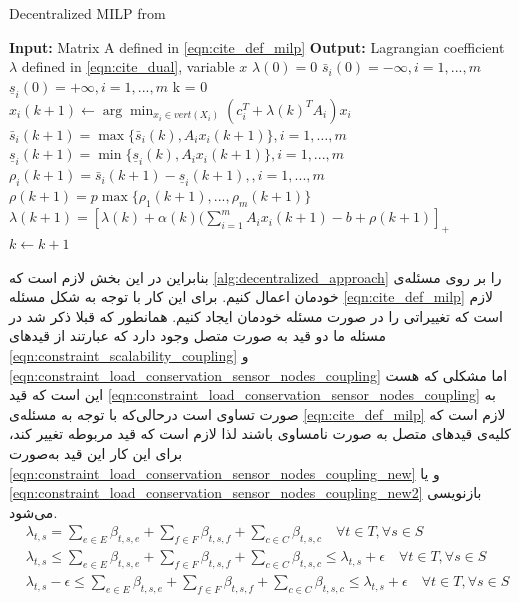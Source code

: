 \begin{latin}
	\begin{algorithm}
		\caption{Decentralized MILP from \cite{decentralized_approach}} \label{alg:decentralized_approach}
		\begin{algorithmic}[1]
			\State \textbf{Input:}  Matrix A defined in \cref{eqn:cite_def_milp}
			\State \textbf{Output:}  Lagrangian coefficient $\lambda$ defined in \cref{eqn:cite_dual}, variable $x$  
			\Procedure{}{}       %
				\State $\lambda(0) = 0$
				\State $\bar{s}_i(0) = -\infty , i = 1,...,m$ 
				\State $\underline{s}_i(0) = +\infty , i = 1,...,m$ 
				\State k = 0
				\Repeat
						\State $x_i(k+1) \gets \arg \displaystyle \min_{x_i \in vert(X_i)} (c_i^T + \lambda(k)^TA_i)x_i$
					\EndFor
					\State $\bar{s}_i(k+1) = \max\{\bar{s}_i(k), A_ix_i(k+1) \} , i = 1, \dots, m$
					\State $\underline{s}_i(k+1) = \min\{\underline{s}_i(k), A_ix_i(k+1) \} , i = 1,...,m$
					\State $\rho_i(k+1) = \bar{s}_i(k+1) - \underline{s}_i(k+1),  , i = 1,...,m$
					\State $\rho(k+1) = p \max \{ \rho_1(k+1), ..., \rho_m(k+1) \}$
					\State $\lambda(k+1) = [\lambda(k) + \alpha(k)(\sum_{i=1}^{m}A_ix_i(k+1)-b+\rho(k+1)]_+$
					\State $k \gets k+1$ 
			\EndProcedure
		\end{algorithmic}
	\end{algorithm}
\end{latin}
	بنابراین در این بخش لازم است که \cref{alg:decentralized_approach} را بر روی مسئله‌ی خودمان اعمال کنیم. برای این کار با توجه به شکل مسئله \cref{eqn:cite_def_milp} لازم است که تغییراتی را در صورت مسئله خودمان ایجاد کنیم. همانطور که قبلا ذکر شد در مسئله ما دو قید به صورت متصل وجود دارد که عبارتند از قیدهای \cref{eqn:constraint_scalability_coupling} و \cref{eqn:constraint_load_conservation_sensor_nodes_coupling} اما مشکلی که هست این است که قید \cref{eqn:constraint_load_conservation_sensor_nodes_coupling} به صورت تساوی است درحالی‌که با توجه به مسئله‌ی \cref{eqn:cite_def_milp} لازم است که کلیه‌ی قیدهای متصل به صورت نامساوی باشند لذا لازم است که قید مربوطه تغییر کند، برای این کار این قید به‌صورت \cref{eqn:constraint_load_conservation_sensor_nodes_coupling_new} و یا \cref{eqn:constraint_load_conservation_sensor_nodes_coupling_new2} بازنویسی می‌شود. 
	\begin{subequations}
		\begin{align}
			&\lambda_{t,s} = \sum_{e \in E} \beta_{t,s,e} + \sum_{f \in F} \beta_{t,s,f}
			+\sum_{c \in C}\beta_{t,s,c} \quad \forall{t \in T}, \forall{s \in S} \\
			&\lambda_{t,s} \le \sum_{e \in E} \beta_{t,s,e} + \sum_{f \in F} \beta_{t,s,f}
			+\sum_{c \in C}\beta_{t,s,c} \le \lambda_{t,s}+\epsilon \quad \forall{t \in T}, \forall{s \in S} \label{eqn:constraint_load_conservation_sensor_nodes_coupling_new} \\
			&\lambda_{t,s} - \epsilon \le \sum_{e \in E} \beta_{t,s,e} + \sum_{f \in F} \beta_{t,s,f}
			+\sum_{c \in C}\beta_{t,s,c} \le \lambda_{t,s}+\epsilon \quad \forall{t \in T}, \forall{s \in S}\label{eqn:constraint_load_conservation_sensor_nodes_coupling_new2}
		\end{align}
	\end{subequations}
